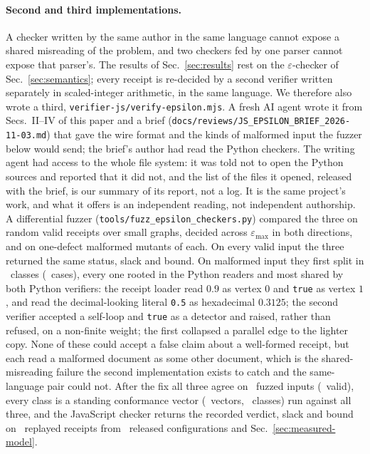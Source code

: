 \documentclass[aps,pra,twocolumn,superscriptaddress,nofootinbib,longbibliography,floatfix]{revtex4-2}
\newcommand{\eps}{\varepsilon}
\begin{document}
\paragraph*{Second and third implementations.} A checker written by the same author in the same language cannot expose a shared misreading of the problem, and two checkers fed by one parser cannot expose that parser's. The results of Sec.~\ref{sec:results} rest on the $\eps$-checker of Sec.~\ref{sec:semantics}; every receipt is re-decided by a second verifier written separately in scaled-integer arithmetic, in the same language. We therefore also wrote a third, \nolinkurl{verifier-js/verify-epsilon.mjs}. A fresh AI agent wrote it from Secs.~II--IV of this paper and a brief (\nolinkurl{docs/reviews/JS_EPSILON_BRIEF_2026-11-03.md}) that gave the wire format and the kinds of malformed input the fuzzer below would send; the brief's author had read the Python checkers. The writing agent had access to the whole file system: it was told not to open the Python sources and reported that it did not, and the list of the files it opened, released with the brief, is our summary of its report, not a log. It is the same project's work, and what it offers is an independent reading, not independent authorship. A differential fuzzer (\nolinkurl{tools/fuzz_epsilon_checkers.py}) compared the three on random valid receipts over small graphs, decided across $\eps_{\max}$ in both directions, and on one-defect malformed mutants of each. On every valid input the three returned the same status, slack and bound. On malformed input they first split in \FuzzClassesBefore\ classes (\FuzzDisagreementsBefore\ cases), every one rooted in the Python readers and most shared by both Python verifiers: the receipt loader read $0.9$ as vertex $0$ and \texttt{true} as vertex $1$, and read the decimal-looking literal \texttt{0.5} as hexadecimal $0.3125$; the second verifier accepted a self-loop and \texttt{true} as a detector and raised, rather than refused, on a non-finite weight; the first collapsed a parallel edge to the lighter copy. None of these could accept a false claim about a well-formed receipt, but each read a malformed document as some other document, which is the shared-misreading failure the second implementation exists to catch and the same-language pair could not. After the fix all three agree on \FuzzCases\ fuzzed inputs (\FuzzValidCases\ valid), every class is a standing conformance vector (\EpsVectors\ vectors, \EpsVectorClasses\ classes) run against all three, and the JavaScript checker returns the recorded verdict, slack and bound on \JsReplayReceipts\ replayed receipts from \JsReplayConfigs\ released configurations and Sec.~\ref{sec:measured-model}.
\end{document}
